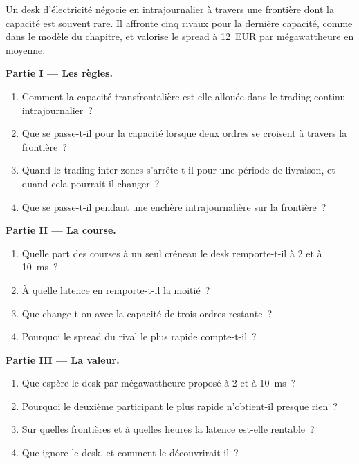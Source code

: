 \begin{problem}\label{pb:nw:power-commodities-and-betting-connectivity:1}
Un desk d'électricité négocie en intrajournalier à travers une frontière dont la capacité est souvent rare. Il affronte cinq rivaux pour la dernière capacité, comme dans le modèle du
chapitre, et valorise le spread à 12~EUR par mégawattheure en moyenne.

\medskip\noindent\textbf{Partie I --- Les règles.}
\begin{enumerate}
\item Comment la capacité transfrontalière est-elle allouée dans le trading continu intrajournalier~?
\item Que se passe-t-il pour la capacité lorsque deux ordres se croisent à travers la frontière~?
\item Quand le trading inter-zones s'arrête-t-il pour une période de livraison, et quand cela pourrait-il changer~?
\item Que se passe-t-il pendant une enchère intrajournalière sur la frontière~?
\end{enumerate}

\medskip\noindent\textbf{Partie II --- La course.}
\begin{enumerate}[resume]
\item Quelle part des courses à un seul créneau le desk remporte-t-il à 2 et à \qty{10}{\milli\second}~?
\item À quelle latence en remporte-t-il la moitié~?
\item Que change-t-on avec la capacité de trois ordres restante~?
\item Pourquoi le spread du rival le plus rapide compte-t-il~?
\end{enumerate}

\medskip\noindent\textbf{Partie III --- La valeur.}
\begin{enumerate}[resume]
\item Que espère le desk par mégawattheure proposé à 2 et à \qty{10}{\milli\second}~?
\item Pourquoi le deuxième participant le plus rapide n'obtient-il presque rien~?
\item Sur quelles frontières et à quelles heures la latence est-elle rentable~?
\item Que ignore le desk, et comment le découvrirait-il~?
\end{enumerate}


\end{problem}
